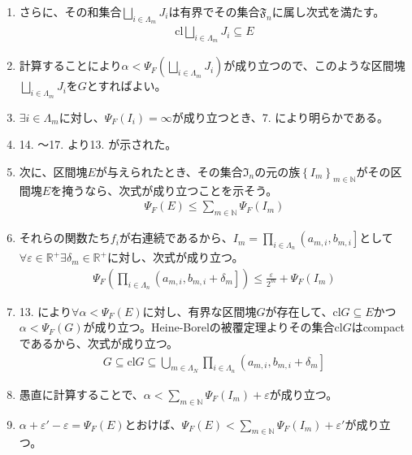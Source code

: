 \documentclass[dvipdfmx]{jsarticle}
\begin{document}
\begin{enumerate}
\item
  さらに、その和集合$\bigsqcup_{i \in \varLambda_{m}} J_{i}$は有界でその集合$\mathfrak{F}_{n}$に属し次式を満たす。
  \begin{align*}
  \mathrm{cl}{\bigsqcup_{i \in \varLambda_{m}} J_{i}} \subseteq E
  \end{align*}
\item
  計算することにより$\alpha < \varPsi_{F}\left( \bigsqcup_{i \in \varLambda_{m}} J_{i} \right)$が成り立つので、このような区間塊$\bigsqcup_{i \in \varLambda_{m}} J_{i}$を$G$とすればよい。
\item
  $\exists i \in \varLambda_{m}$に対し、$\varPsi_{F}\left( I_{i} \right) = \infty$が成り立つとき、7.
  により明らかである。
\item
  14. ～17. より13. が示された。
\item
  次に、区間塊$E$が与えられたとき、その集合$\mathfrak{I}_{n}$の元の族$\left\{ I_{m} \right\}_{m \in \mathbb{N}}$がその区間塊$E$を掩うなら、次式が成り立つことを示そう。
  \begin{align*}
  \varPsi_{F}(E) \leq \sum_{m \in \mathbb{N}} {\varPsi_{F}\left( I_{m} \right)}
  \end{align*}
\item
  それらの関数たち$f_{i}$が右連続であるから、$I_{m} = \prod_{i \in \varLambda_{n}} \left( a_{m,i},b_{m,i} \right]$として$\forall\varepsilon \in \mathbb{R}^{+}\exists\delta_{m} \in \mathbb{R}^{+}$に対し、次式が成り立つ。
  \begin{align*}
  \varPsi_{F}\left( \prod_{i \in \varLambda_{n}} \left( a_{m,i},b_{m,i} + \delta_{m} \right] \right) \leq \frac{\varepsilon}{2^{m}} + \varPsi_{F}\left( I_{m} \right)
  \end{align*}
\item
  13. により$\forall\alpha < \varPsi_{F}(E)$に対し、有界な区間塊$G$が存在して、$\mathrm{cl}G \subseteq E$かつ$\alpha < \varPsi_{F}(G)$が成り立つ。Heine-Borelの被覆定理よりその集合$\mathrm{cl}G$はcompactであるから、次式が成り立つ。
  \begin{align*}
  G \subseteq \mathrm{cl}G \subseteq \bigcup_{m \in \varLambda_{N}} {\prod_{i \in \varLambda_{n}} \left( a_{m,i},b_{m,i} + \delta_{m} \right]}
  \end{align*}
\item
  愚直に計算することで、$\alpha < \sum_{m \in \mathbb{N}} {\varPsi_{F}\left( I_{m} \right)} + \varepsilon$が成り立つ。
\item
  $\alpha + \varepsilon' - \varepsilon = \varPsi_{F}(E)$とおけば、$\varPsi_{F}(E) < \sum_{m \in \mathbb{N}} {\varPsi_{F}\left( I_{m} \right)} + \varepsilon'$が成り立つ。

\end{enumerate}
\end{document}
